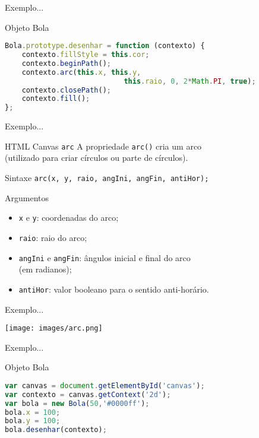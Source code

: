 \documentclass[xcolor=dvipsnames,table]{beamer}
\begin{document}
\begin{frame}[fragile]{Exemplo...}
	\begin{block}{Objeto Bola}
		\begin{lstlisting}[language=JavaScript]
Bola.prototype.desenhar = function (contexto) {
	contexto.fillStyle = this.cor;
	contexto.beginPath();
	contexto.arc(this.x, this.y, 
							this.raio, 0, 2*Math.PI, true);
	contexto.closePath();
	contexto.fill();
};
\end{lstlisting}	
	\end{block}
\end{frame}

\begin{frame}[fragile]{Exemplo...} 
	\begin{block}{HTML Canvas {\tt arc}}
		A propriedade {\tt arc()} cria um arco \\(utilizado para criar círculos ou parte de círculos). 
	\end{block}
	\begin{block}{Sintaxe}
		{\tt arc(x, y, raio, angIni, angFin, antiHor);}
	\end{block}
	\begin{block}{Argumentos}
		\begin{itemize}
			\item {\tt x} e {\tt y}: coordenadas do arco;
			\item {\tt raio}: raio do arco; 
			\item {\tt angIni} e {\tt angFin}: ângulos inicial e final do arco \\(em radianos);
			\item {\tt antiHor}: valor booleano para o sentido anti-horário.
		\end{itemize}
	\end{block}
\end{frame}

\begin{frame}{Exemplo...}
	\begin{center}
		\texttt{[image: images/arc.png]}
	\end{center}
\end{frame}

\begin{frame}[fragile]{Exemplo...}
	\begin{block}{Objeto Bola}
		\begin{lstlisting}[language=JavaScript]
var canvas = document.getElementById('canvas');
var contexto = canvas.getContext('2d');
var bola = new Bola(50,'#0000ff');
bola.x = 100;
bola.y = 100;
bola.desenhar(contexto);
\end{lstlisting}	
	\end{block}
\end{frame}
\end{document}
